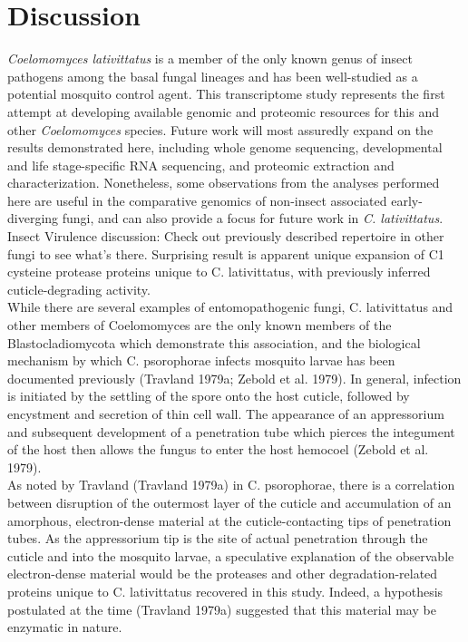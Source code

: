 \section{Discussion}
\textit{Coelomomyces lativittatus} is a member of the only known genus of insect pathogens among the basal fungal lineages and has been well-studied as a potential mosquito control agent. This transcriptome study represents the first attempt at developing available genomic and proteomic resources for this and other \textit{Coelomomyces} species. Future work will most assuredly expand on the results demonstrated here, including whole genome sequencing, developmental and life stage-specific RNA sequencing, and proteomic extraction and characterization. Nonetheless, some observations from the analyses performed here are useful in the comparative genomics of non-insect associated early-diverging fungi, and can also provide a focus for future work in \textit{C. lativittatus}. \\
\indent Insect Virulence discussion: Check out previously described repertoire in other fungi to see what’s there. Surprising result is apparent unique expansion of C1 cysteine protease proteins unique to C. lativittatus, with previously inferred cuticle-degrading activity. \\
\indent While there are several examples of entomopathogenic fungi, C. lativittatus and other members of Coelomomyces are the only known members of the Blastocladiomycota which demonstrate this association, and the biological mechanism by which C. psorophorae infects mosquito larvae has been documented previously (Travland 1979a; Zebold et al. 1979). In general, infection is initiated by the settling of the spore onto the host cuticle, followed by encystment and secretion of thin cell wall. The appearance of an appressorium and subsequent development of a penetration tube which pierces the integument of the host then allows the fungus to enter the host hemocoel (Zebold et al. 1979). \\
\indent As noted by Travland (Travland 1979a) in C. psorophorae, there is a correlation between disruption of the outermost layer of the cuticle and accumulation of an amorphous, electron-dense material at the cuticle-contacting tips of penetration tubes. As the appressorium tip is the site of actual penetration through the cuticle and into the mosquito larvae, a speculative explanation of the observable electron-dense material would be the proteases and other degradation-related proteins unique to C. lativittatus recovered in this study. Indeed, a hypothesis postulated at the time (Travland 1979a) suggested that this material may be enzymatic in nature. \\
